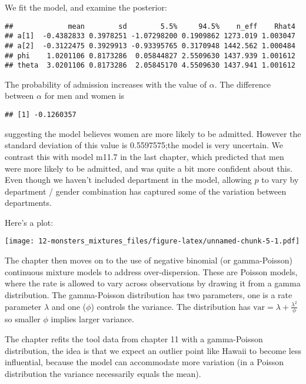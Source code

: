 \documentclass[
]{book}
\newenvironment{Shaded}{\begin{snugshade}}{\end{snugshade}}
\newcommand{\FunctionTok}[1]{\textcolor[rgb]{0.00,0.00,0.00}{#1}}
\newcommand{\NormalTok}[1]{#1}
\newcommand{\SpecialCharTok}[1]{\textcolor[rgb]{0.00,0.00,0.00}{#1}}
\begin{document}
We fit the model, and examine the posterior:

\begin{verbatim}
##             mean        sd        5.5%     94.5%    n_eff    Rhat4
## a[1]  -0.4382833 0.3978251 -1.07298200 0.1909862 1273.019 1.003047
## a[2]  -0.3122475 0.3929913 -0.93395765 0.3170948 1442.562 1.000484
## phi    1.0201106 0.8173286  0.05844827 2.5509630 1437.939 1.001612
## theta  3.0201106 0.8173286  2.05845170 4.5509630 1437.941 1.001612
\end{verbatim}

The probability of admission increases with the value of \(\alpha\). The difference between \(\alpha\) for men and women is

\begin{Shaded}
\end{Shaded}

\begin{verbatim}
## [1] -0.1260357
\end{verbatim}

suggesting the model believes women are more likely to be admitted. However the standard deviation of this value is 0.5597575;the model is very uncertain. We contrast this with model m11.7 in the last chapter, which predicted that men were more likely to be admitted, and was quite a bit more confident about this. Even though we haven't included department in the model, allowing \(p\) to vary by department / gender combination has captured some of the variation between departments.

Here's a plot:

\texttt{[image: 12-monsters\_mixtures\_files/figure-latex/unnamed-chunk-5-1.pdf]}

The chapter then moves on to the use of negative binomial (or gamma-Poisson) continuous mixture models to address over-dispersion. These are Poisson models, where the rate is allowed to vary across observations by drawing it from a gamma distribution. The gamma-Poisson distribution has two parameters, one is a rate parameter \(\lambda\) and one (\(\phi\)) controls the variance. The distribution has \(\text{var} = \lambda + \frac{\lambda^2}{\phi}\) so smaller \(\phi\) implies larger variance.

The chapter refits the tool data from chapter 11 with a gamma-Poisson distribution, the idea is that we expect an outlier point like Hawaii to become less influential, because the model can accommodate more variation (in a Poisson distribution the variance necessarily equals the mean).
\end{document}
